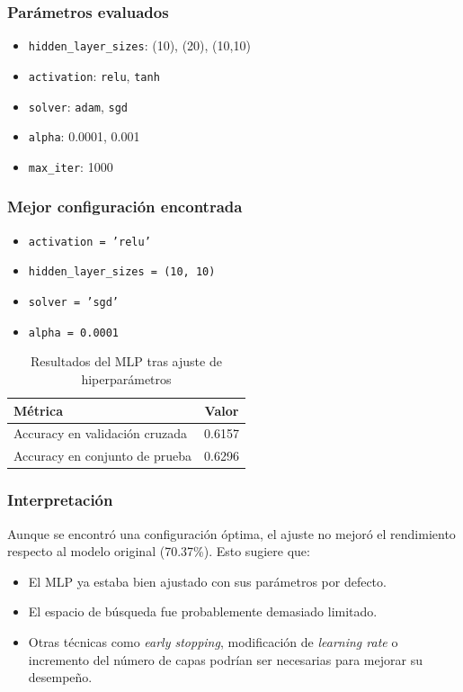 \documentclass[11pt,a4paper]{article}
\begin{document}
\subsubsection*{Parámetros evaluados}

\begin{itemize}
    \item \texttt{hidden\_layer\_sizes}: (10), (20), (10,10)
    \item \texttt{activation}: \texttt{relu}, \texttt{tanh}
    \item \texttt{solver}: \texttt{adam}, \texttt{sgd}
    \item \texttt{alpha}: 0.0001, 0.001
    \item \texttt{max\_iter}: 1000
\end{itemize}

\subsubsection*{Mejor configuración encontrada}

\begin{itemize}
    \item \texttt{activation = 'relu'}
    \item \texttt{hidden\_layer\_sizes = (10, 10)}
    \item \texttt{solver = 'sgd'}
    \item \texttt{alpha = 0.0001}
\end{itemize}

\begin{table}[H]
\centering
\begin{tabular}{lc}
\toprule
\textbf{Métrica} & \textbf{Valor} \\
\midrule
Accuracy en validación cruzada & 0.6157 \\
Accuracy en conjunto de prueba & 0.6296 \\
\bottomrule
\end{tabular}
\caption{Resultados del MLP tras ajuste de hiperparámetros}
\end{table}

\subsubsection*{Interpretación}

Aunque se encontró una configuración óptima, el ajuste no mejoró el rendimiento respecto al modelo original (70.37\%). Esto sugiere que:

\begin{itemize}
    \item El MLP ya estaba bien ajustado con sus parámetros por defecto.
    \item El espacio de búsqueda fue probablemente demasiado limitado.
    \item Otras técnicas como \textit{early stopping}, modificación de \textit{learning rate} o incremento del número de capas podrían ser necesarias para mejorar su desempeño.
\end{itemize}
\end{document}
